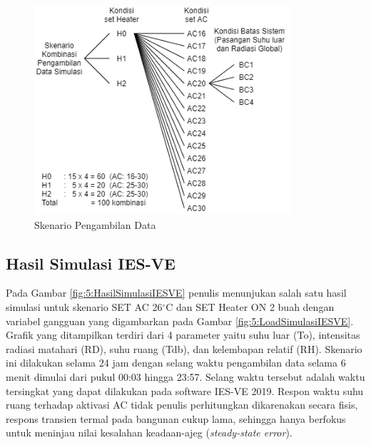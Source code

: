 \begin{figure}[!h]
	\centering
	\includegraphics[width=0.85\textwidth]{figures/SkenarioData}
	\caption{Skenario Pengambilan Data}
	\label{fig:5:SkenarioData}
\end{figure}
\vspace{1em}
\break
\break

\subsection{Hasil Simulasi IES-VE}

Pada Gambar \ref{fig:5:HasilSimulasiIESVE} penulis menunjukan salah satu hasil simulasi untuk skenario SET AC 26$^\circ$C dan SET Heater ON 2 buah dengan variabel gangguan yang digambarkan pada Gambar \ref{fig:5:LoadSimulasiIESVE}. Grafik yang ditampilkan terdiri dari 4 parameter yaitu suhu luar (To), intensitas radiasi matahari (RD), suhu ruang (Tdb), dan kelembapan relatif (RH). Skenario ini dilakukan selama 24 jam dengan selang waktu pengambilan data selama 6 menit dimulai dari pukul 00:03 hingga 23:57. Selang waktu tersebut adalah waktu tersingkat yang dapat dilakukan pada software IES-VE 2019. Respon waktu suhu ruang terhadap aktivasi AC tidak penulis perhitungkan dikarenakan secara fisis, respons transien termal pada bangunan cukup lama, sehingga hanya berfokus untuk meninjau nilai kesalahan keadaan-ajeg (\textit{steady-state error}).


